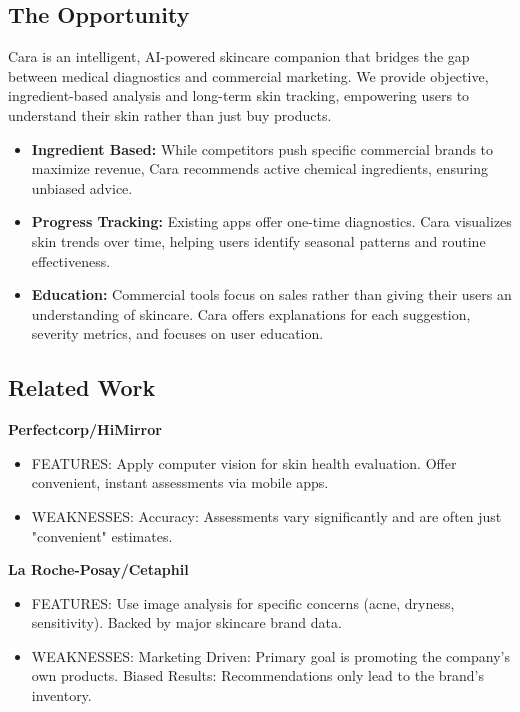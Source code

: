 \documentclass[12pt,a4paper]{article}
\begin{document}
\subsection{The Opportunity}
Cara is an intelligent, AI-powered skincare companion that bridges the gap between medical diagnostics and commercial marketing. We provide objective, ingredient-based analysis and long-term skin tracking, empowering users to understand their skin rather than just buy products.

\begin{itemize}
    \item \textbf{Ingredient Based:} While competitors push specific commercial brands to maximize revenue, Cara recommends active chemical ingredients, ensuring unbiased advice.
    \item \textbf{Progress Tracking:} Existing apps offer one-time diagnostics. Cara visualizes skin trends over time, helping users identify seasonal patterns and routine effectiveness.
    \item \textbf{Education:} Commercial tools focus on sales rather than giving their users an understanding of skincare. Cara offers explanations for each suggestion, severity metrics, and focuses on user education.
\end{itemize}

\subsection{Related Work}
\textbf{Perfectcorp/HiMirror}
\begin{itemize}
    \item FEATURES: Apply computer vision for skin health evaluation. Offer convenient, instant assessments via mobile apps.
    \item WEAKNESSES: Accuracy: Assessments vary significantly and are often just "convenient" estimates.
\end{itemize}

\textbf{La Roche-Posay/Cetaphil}
\begin{itemize}
    \item FEATURES: Use image analysis for specific concerns (acne, dryness, sensitivity). Backed by major skincare brand data.
    \item WEAKNESSES: Marketing Driven: Primary goal is promoting the company's own products. Biased Results: Recommendations only lead to the brand's inventory.
\end{itemize}
\end{document}
